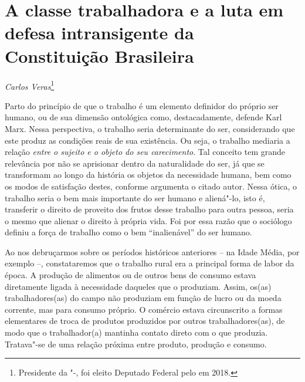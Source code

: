 \chapter*{A classe trabalhadora e a luta em defesa intransigente da
Constituição Brasileira}


\begin{flushright}
\emph{Carlos Veras}\footnote{Presidente da "-, foi eleito
Deputado Federal pelo  em 2018.}
\end{flushright}

Parto do princípio de que o trabalho é um elemento definidor do próprio
ser humano, ou de sua dimensão ontológica como, destacadamente, defende
Karl Marx. Nessa perspectiva, o trabalho seria determinante do ser,
considerando que este produz as condições reais de sua existência. Ou
seja, o trabalho mediaria a relação \emph{entre o sujeito e o objeto do
seu carecimento}. Tal conceito tem grande relevância por não se
aprisionar dentro da naturalidade do ser, já que se transformam ao longo
da história os objetos da necessidade humana, bem como os modos de
satisfação destes, conforme argumenta o citado autor. Nessa ótica, o
trabalho seria o bem mais importante do ser humano e aliená"-lo, isto é,
transferir o direito de proveito dos frutos desse trabalho para outra
pessoa, seria o mesmo que alienar o direito à própria vida. Foi por essa
razão que o sociólogo definiu a força de trabalho como o bem
``inalienável'' do ser humano.

Ao nos debruçarmos sobre os períodos históricos anteriores -- na Idade
Média, por exemplo --, constataremos que o trabalho rural era a
principal forma de labor da época. A produção de alimentos ou de outros
bens de consumo estava diretamente ligada à necessidade daqueles que o
produziam. Assim, os(as) trabalhadores(as) do campo não produziam em
função de lucro ou da moeda corrente, mas para consumo próprio. O
comércio estava circunscrito a formas elementares de troca de produtos
produzidos por outros trabalhadores(as), de modo que o trabalhador(a)
mantinha contato direto com o que produzia. Tratava"-se de uma relação
próxima entre produto, produção e consumo.

